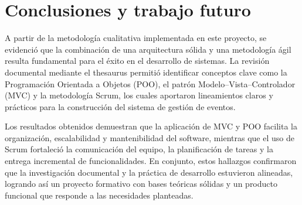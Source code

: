 \section{Conclusiones y trabajo futuro}
A partir de la metodología cualitativa implementada en este proyecto, se evidenció que la combinación de una arquitectura sólida y una metodología ágil resulta fundamental para el éxito en el desarrollo de sistemas. La revisión documental mediante el thesaurus permitió identificar conceptos clave como la Programación Orientada a Objetos (POO), el patrón Modelo–Vista–Controlador (MVC) y la metodología Scrum, los cuales aportaron lineamientos claros y prácticos para la construcción del sistema de gestión de eventos.

Los resultados obtenidos demuestran que la aplicación de MVC y POO facilita la organización, escalabilidad y mantenibilidad del software, mientras que el uso de Scrum fortaleció la comunicación del equipo, la planificación de tareas y la entrega incremental de funcionalidades. En conjunto, estos hallazgos confirmaron que la investigación documental y la práctica de desarrollo estuvieron alineadas, logrando así un proyecto formativo con bases teóricas sólidas y un producto funcional que responde a las necesidades planteadas.